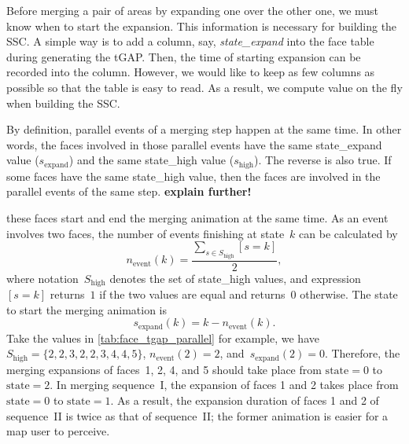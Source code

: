 \documentclass[ijgi,article,submit,moreauthors,pdftex]{Definitions/mdpi}
\begin{document}
Before merging a pair of areas by expanding one over the other one,
we must know when to start the expansion.
This information is necessary for building the SSC.
A simple way is to add a column, say, \emph{state\_expand} 
into the face table during generating the tGAP.
Then, the time of starting expansion can be recorded into the column.
However, we would like to keep as few columns as possible
so that the table is easy to read.
As a result, we compute value  on the fly 
when building the SSC.

By definition, parallel events of a merging step happen at the same time.
In other words, the faces involved in those parallel events have 
the same state\_expand value ($s_\mathrm{expand}$) and 
the same state\_high value ($s_\mathrm{high}$).
The reverse is also true.
If some faces have the same state\_high value,
then the faces are involved in the parallel events of the same step.
\textbf{explain further!}





these faces start and end the merging animation at the same time.
As an event involves two faces,
the number of events finishing at state~$k$ can be calculated by
$$
n_\mathrm{event} (k) = 
\frac{\sum\limits_{s \in S_\mathrm{high}} [s=k]}{2},
$$
where notation~$S_\mathrm{high}$ denotes the set of state\_high values,
and expression~$[s=k]$ returns~$1$ if the two values are equal 
and returns~$0$ otherwise.
The state to start the merging animation is
$$
s_\mathrm{expand} (k) = k - n_\mathrm{event} (k).
$$
Take the values in \tbl\ref{tab:face_tgap_parallel} for example,
we have~$S_\mathrm{high} = \{2, 2, 3, 2, 2, 3, 4, 4, 5\}$, 
$n_\mathrm{event} (2) = 2$, and~$s_\mathrm{expand} (2) = 0$.
Therefore, the merging expansions of faces~1, 2, 4, and 5 
should take place from $\mathrm{state} = 0$  to $\mathrm{state} = 2$.
In merging sequence~I, the expansion of faces 1 and 2 
takes place from $\mathrm{state} = 0$ to $\mathrm{state} = 1$.
As a result, the expansion duration of faces 1 and 2 of sequence~II
is twice as that of sequence~II;
the former animation is easier for a map user to perceive. 


%
\end{document}
